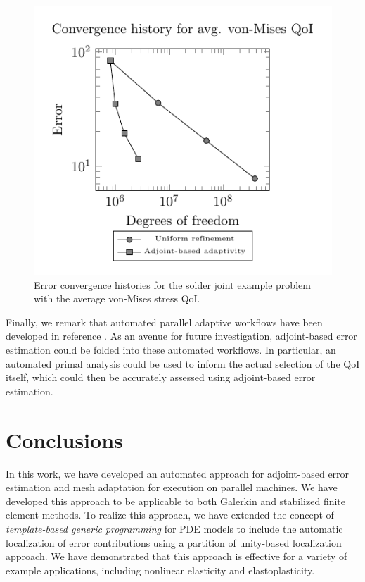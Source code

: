 \begin{figure}[ht!]
\centering
\includegraphics[width=0.5\linewidth]{img/aut_solder_convergence.pdf}
\caption{Error convergence histories for the solder joint example problem
with the average von-Mises stress QoI.}
\label{fig:aut_solder_convergence}
\end{figure}

Finally, we remark that automated parallel adaptive workflows
have been developed in reference \cite{bloomfield2017component}.
As an avenue for future investigation, adjoint-based error estimation
could be folded into these automated workflows.
In particular, an automated primal analysis could be used to inform
the actual selection of the QoI itself, which could then be accurately
assessed using adjoint-based error estimation.

\section{Conclusions}

In this work, we have developed an automated approach for
adjoint-based error estimation and mesh adaptation for
execution on parallel machines. We have developed this approach
to be applicable to both Galerkin and stabilized finite
element methods. To realize this approach, we have extended
the concept of \emph{template-based generic programming} for
PDE models to include the automatic localization of error
contributions using a partition of unity-based
localization approach. We have demonstrated that this approach
is effective for a variety of example applications, including
nonlinear elasticity and elastoplasticity.
